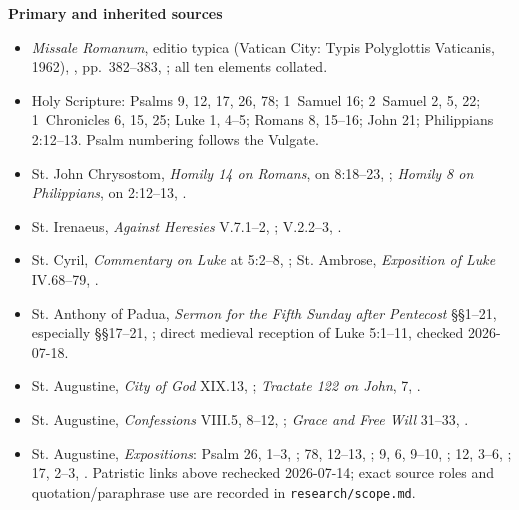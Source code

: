 \textbf{Primary and inherited sources}
{\footnotesize
\begin{itemize}[itemsep=0em,topsep=0.15em,parsep=0pt]
\item \emph{Missale Romanum}, editio typica (Vatican City: Typis Polyglottis Vaticanis, 1962), , pp.~382--383, ; all ten elements collated.
\item Holy Scripture: Psalms 9, 12, 17, 26, 78; 1~Samuel 16; 2~Samuel 2, 5, 22; 1~Chronicles 6, 15, 25; Luke 1, 4--5; Romans 8, 15--16; John 21; Philippians 2:12--13. Psalm numbering follows the Vulgate.
\item St. John Chrysostom, \emph{Homily 14 on Romans}, on 8:18--23, ; \emph{Homily 8 on Philippians}, on 2:12--13, .
\item St. Irenaeus, \emph{Against Heresies} V.7.1--2, ; V.2.2--3, .
\item St. Cyril, \emph{Commentary on Luke} at 5:2--8, ; St. Ambrose, \emph{Exposition of Luke} IV.68--79, .
\item St. Anthony of Padua, \emph{Sermon for the Fifth Sunday after Pentecost} §§1--21, especially §§17--21, ; direct medieval reception of Luke 5:1--11, checked 2026-07-18.
\item St. Augustine, \emph{City of God} XIX.13, ; \emph{Tractate 122 on John}, 7, .
\item St. Augustine, \emph{Confessions} VIII.5, 8--12, ; \emph{Grace and Free Will} 31--33, .
\item St. Augustine, \emph{Expositions}: Psalm 26, 1--3, ; 78, 12--13, ; 9, 6, 9--10, ; 12, 3--6, ; 17, 2--3, . Patristic links above rechecked 2026-07-14; exact source roles and quotation/paraphrase use are recorded in \texttt{research/scope.md}.

\end{itemize}}
